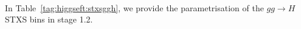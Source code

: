 \\
  [\textbf SETUP, check with Simone]
  \\

  \\
    [\textbf PLOTS]


    In Table~\ref{tag:higgseft:stxsggh}, we provide the parametrisation of the $gg\to H$ STXS bins in stage 1.2.

    
    







~\newline~

\let\Herwig\undefined
\let\Pythia\undefined
\let\Sherpa\undefined
\let\Rivet\undefined
\let\Professor\undefined
\let\eps\undefined
\let\mc\undefined
\let\mr\undefined
\let\mb\undefined
\let\tm\undefined




